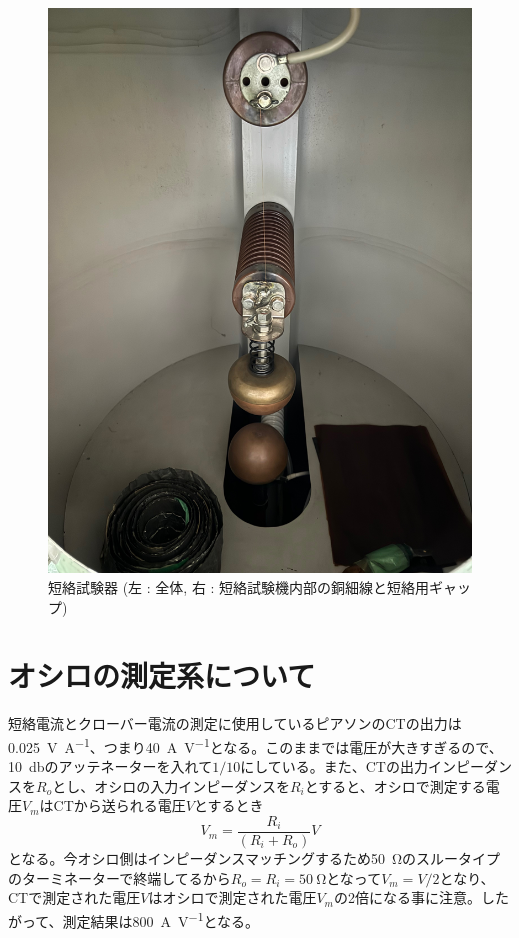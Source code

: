 \documentclass[book,openany]{jlreq}
\theoremstyle{definition}
\begin{document}
\begin{figure}[htbp]
\begin{minipage}[b]{0.45\linewidth}
    \includegraphics[width=0.9\columnwidth]{./figs/Tanraku2.jpeg}
  \end{minipage}
  \caption{短絡試験器 (左 : 全体, 右 : 短絡試験機内部の銅細線と短絡用ギャップ)}
  \label{fig:Tanraku}
\end{figure}

\section{オシロの測定系について}
短絡電流とクローバー電流の測定に使用しているピアソンのCTの出力は\SI{0.025}{V\per A}、つまり\SI{40}{A\per V}となる。このままでは電圧が大きすぎるので、\SI{10}{\decibel}のアッテネーターを入れて$1/10$にしている。また、CTの出力インピーダンスを$R_o$とし、オシロの入力インピーダンスを$R_i$とすると、オシロで測定する電圧$V_m$はCTから送られる電圧$V$とするとき
%
\begin{equation}
  V_m = \frac{R_i}{(R_i + R_o)} V
\end{equation}
%
となる。今オシロ側はインピーダンスマッチングするため\SI{50}{\ohm}のスルータイプのターミネーターで終端してるから$R_o=R_i=\SI{50}{\ohm}$となって$V_m=V/2$となり、CTで測定された電圧$V$はオシロで測定された電圧$V_m$の2倍になる事に注意。したがって、測定結果は\SI{800}{A\per V}となる。
\end{document}
